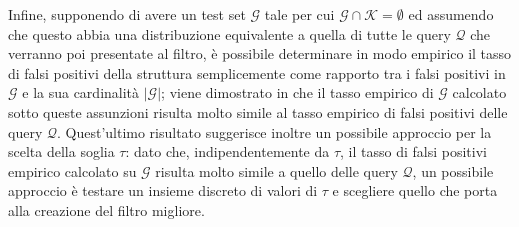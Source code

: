 \documentclass[../../main.tex]{subfiles}
\begin{document}
    Infine, supponendo di avere un test set $\mathcal{G}$ tale per cui $\mathcal{G} \cap \mathcal{K} = \emptyset$ ed assumendo che questo abbia una distribuzione equivalente a quella di tutte le query $\mathcal{Q}$ che verranno poi presentate al filtro, è possibile determinare in modo empirico il tasso di falsi positivi della struttura semplicemente come rapporto tra i falsi positivi in $\mathcal{G}$ e la sua cardinalità $|\mathcal{G}|$; viene dimostrato in \cite{10.5555/3326943.3326986} che il tasso empirico di $\mathcal{G}$ calcolato sotto queste assunzioni risulta molto simile al tasso empirico di falsi positivi delle query $\mathcal{Q}$. Quest'ultimo risultato suggerisce inoltre un possibile approccio per la scelta della soglia $\tau$: dato che, indipendentemente da $\tau$, il tasso di falsi positivi empirico calcolato su $\mathcal{G}$ risulta molto simile a quello delle query $\mathcal{Q}$, un possibile approccio è testare un insieme discreto di valori di $\tau$ e scegliere quello che porta alla creazione del filtro migliore.
\end{document}
